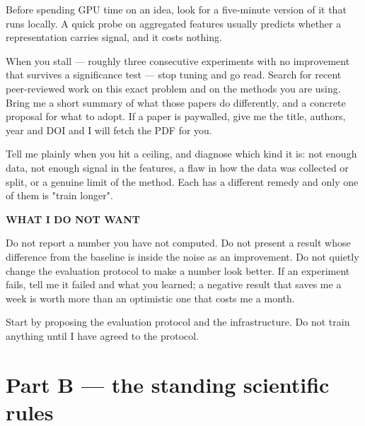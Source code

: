 \documentclass[11pt,a4paper]{article}
\begin{document}
\begin{promptbox}
Before spending GPU time on an idea, look for a five-minute version of it that
runs locally. A quick probe on aggregated features usually predicts whether a
representation carries signal, and it costs nothing.

When you stall --- roughly three consecutive experiments with no improvement
that survives a significance test --- stop tuning and go read. Search for recent
peer-reviewed work on this exact problem and on the methods you are using.
Bring me a short summary of what those papers do differently, and a concrete
proposal for what to adopt. If a paper is paywalled, give me the title, authors,
year and DOI and I will fetch the PDF for you.

Tell me plainly when you hit a ceiling, and diagnose which kind it is: not
enough data, not enough signal in the features, a flaw in how the data was
collected or split, or a genuine limit of the method. Each has a different
remedy and only one of them is "train longer".

\vspace{3pt}\textbf{WHAT I DO NOT WANT}

Do not report a number you have not computed. Do not present a result whose
difference from the baseline is inside the noise as an improvement. Do not
quietly change the evaluation protocol to make a number look better. If an
experiment fails, tell me it failed and what you learned; a negative result that
saves me a week is worth more than an optimistic one that costs me a month.

Start by proposing the evaluation protocol and the infrastructure. Do not train
anything until I have agreed to the protocol.
\end{promptbox}

\section{Part B --- the standing scientific rules}
\end{document}
